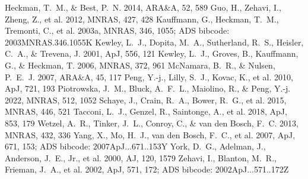 \documentclass[twocolumn]{aastex631}
\begin{document}
\begin{thebibliography}{}
 Heckman, T.~M., \& Best, P.~N. 2014, ARA\&A, 52, 589
 Guo, H., Zehavi, I., Zheng, Z., et al. 2012, MNRAS, 427, 428
 Kauffmann, G., Heckman, T.~M., Tremonti, C., et al. 2003a, MNRAS, 346, 1055; ADS bibcode: 2003MNRAS.346.1055K
 Kewley, L.~J., Dopita, M.~A., Sutherland, R.~S., Heisler, C.~A., \& Trevena, J. 2001, ApJ, 556, 121
 Kewley, L.~J., Groves, B., Kauffmann, G., \& Heckman, T. 2006, MNRAS, 372, 961
 McNamara, B.~R., \& Nulsen, P.~E.~J. 2007, ARA\&A, 45, 117
 Peng, Y.-j., Lilly, S.~J., Kovac, K., et al. 2010, ApJ, 721, 193
 Piotrowska, J.~M., Bluck, A.~F.~L., Maiolino, R., \& Peng, Y.-j. 2022, MNRAS, 512, 1052
 Schaye, J., Crain, R.~A., Bower, R.~G., et al. 2015, MNRAS, 446, 521
 Tacconi, L.~J., Genzel, R., Saintonge, A., et al. 2018, ApJ, 853, 179
 Wetzel, A.~R., Tinker, J.~L., Conroy, C., \& van den Bosch, F.~C. 2013, MNRAS, 432, 336
 Yang, X., Mo, H.~J., van den Bosch, F.~C., et al. 2007, ApJ, 671, 153; ADS bibcode: 2007ApJ...671..153Y
 York, D.~G., Adelman, J., Anderson, J.~E., Jr., et al. 2000, AJ, 120, 1579
 Zehavi, I., Blanton, M.~R., Frieman, J.~A., et al. 2002, ApJ, 571, 172; ADS bibcode: 2002ApJ...571..172Z
\end{thebibliography}
\end{document}
